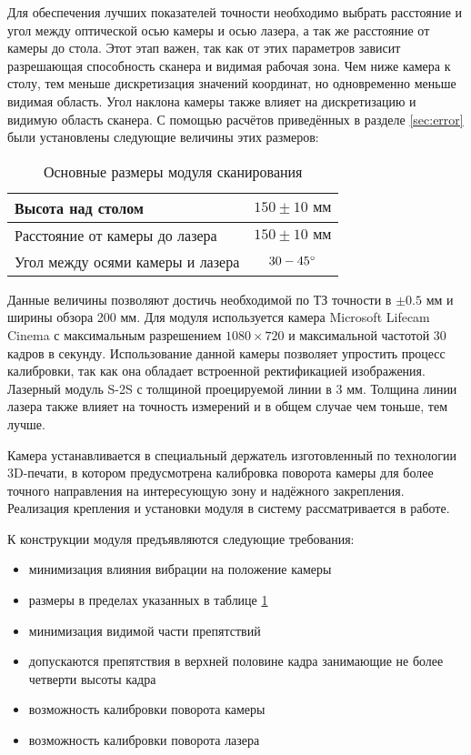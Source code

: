         Для обеспечения лучших показателей точности необходимо выбрать расстояние и угол между оптической осью камеры и осью лазера, а так же расстояние от камеры до стола. Этот этап важен, так как от этих параметров зависит разрешающая способность сканера и видимая рабочая зона. Чем ниже камера к столу, тем меньше дискретизация значений координат, но одновременно меньше видимая область. Угол наклона камеры также влияет на дискретизацию и видимую область сканера.
        С помощью расчётов приведённых в разделе \ref{sec:error} были установлены следующие величины этих размеров:
        \begin{table}[H]
            \centering
            \caption{Основные размеры модуля сканирования}\label{table:dims}
            \begin{tabular}{|l|c|} \hline
                Высота над столом& $ 150  \pm 10 \text{ мм} $\\ \hline
                Расстояние от камеры до лазера& $ 150  \pm 10 \text{ мм} $\\ \hline
                Угол между осями камеры и лазера& $ 30-45^{\circ} $\\ \hline
            \end{tabular}
        \end{table}
        Данные величины позволяют достичь необходимой по ТЗ точности в $ \pm 0.5 \text{ мм} $ и ширины обзора 200 мм.
        Для модуля используется камера Microsoft Lifecam Cinema с максимальным разрешением $ 1080 
        \times 720 $ и максимальной частотой 30 кадров в секунду. Использование данной камеры позволяет упростить процесс калибровки, так как она обладает встроенной ректификацией изображения. Лазерный модуль S-2S с толщиной проецируемой линии в 3 мм. Толщина линии лазера также влияет на точность измерений и в общем случае чем тоньше, тем лучше.

        Камера устанавливается в специальный держатель изготовленный по технологии 3D-печати, в котором предусмотрена калибровка поворота камеры для более точного направления на интересующую зону и надёжного закрепления. Реализация крепления и установки модуля в систему рассматривается в работе\cite{matsu}. 

        К конструкции модуля предъявляются следующие требования:
        \begin{itemize}
            \item минимизация влияния вибрации на положение камеры
            \item размеры в пределах указанных в таблице \ref{table:dims}
            \item минимизация видимой части препятствий
            \item допускаются препятствия в верхней половине кадра занимающие не более четверти высоты кадра
            \item возможность калибровки поворота камеры
            \item возможность калибровки поворота лазера
        \end{itemize}
    
